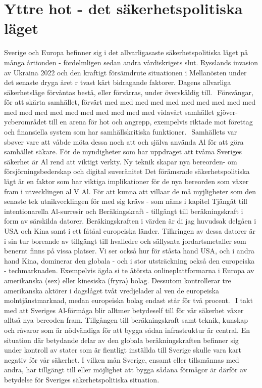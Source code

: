 {{{{{{{{\section*{Yttre hot - det säkerhetspolitiska läget}
Sverige och Europa befinner sig i det allvarligasaste säkerhetspolitiska läget på många årtionden - fördelmligen sedan andra vårdiskrigets slut. Rysslands invasion av Ukraina 2022 och den kraftigt försämdrute situationen i Mellanösten under det senaste dryga året r tvast kärt bidragande faktorer. Dagens allvarliga säkerhetsläge förvåntas bestå, eller förvärras, under överskåldig till. \({ }^{}\) Försvångar, för att skärta samhället, förvärt med med med med med med med med med med med med med med med med med med med med vidavårt samhället gjöver-ycberområdet till en arena för hot och angrepp, exempelvis riktade mot förettag och finansiella system som har samhällskritiska funktioner. \({ }^{}\) Samhällets var sbøver vare att våbde möta dessa noch att och själva använda Al för att göra samhället säkare. För de myndigheter som har uppdraget att tvåma Sveriges säkerhet är Al rend att viktigt verkty.
Ny teknik skapar nya bereorden- om försjörningsbederskap och digital suveränitet Det förämsrade säkerhetspolitiska lägt är en faktor som har viktiga implikationer för de nya bereorden som växer fram i utvecklingen al \(\mathrm{V}\) Al. För att kunna att villaar de må myjligheter som den senaste tek utnikvecklingen för med sig krävs - som näms i kapitel Tjängåt till intentionarella Al-surresir och Beräkingskraft - tillgängt till beräkningskraft i form av särskilda datorer. Beräkingskraften i värden är di jag huvudsak delgåen i USA och Kina samt i ett fåtåal europeiska länder. Tilkringen av dessa datorer är i sin tur boreande av tillgängt till hvalledre och sällysnta jordartsmetaller som benernt finns på vissa platser. Vi ser också hur för ståsta hand USA, och i andra hand
Kina, dominerar den globala - och i stor utsträckning också den europeiska - techmarknaden. Exempelvis ägda si te åtörsta onlineplattformarna i Europa av amerikanska (sex) eller kinesiska (fryra) bolag. Dessutom kontrollerar tre amerikanska aktörer i dagslåget tvåt vredjelader al ven de europeiska molntjänstmarknad, medan europeiska bolag endast står för två procent. \({ }^{}\)
I takt med att Sveriges Al-förmåga blir alltmer betydeself till för vår säkerhet växer alltså nya bereoden fram. Tillgången till beräkningskraft samt teknik, kunskap och råvaror som är nödvändiga för att bygga sådan infrastruktur är central. En situation där betydande delar av den globala beräkningskraften befinner sig under kontroll av stater som är fientligt inställda till Sverige skulle vara kart negativ för vår säkerhet. I vilken mån Sverige, ensamt eller tillsmännas med andra, har tillgängt till eller möjlighet att bygga sådana förmågor är därför av betydelse för Sveriges säkerhetspolitiska situation.
}}}}}}}}
